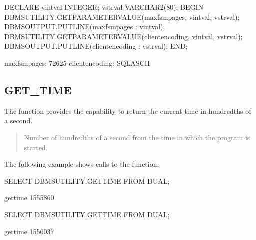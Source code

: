 \documentclass[letterpaper,10pt,english,openany,oneside]{sphinxmanual}
\begin{document}
%
\begin{sphinxVerbatim}[commandchars=\\\{\}]
DECLARE
    v\PYGZus{}intval        INTEGER;
    v\PYGZus{}strval        VARCHAR2(80);
BEGIN
    DBMS\PYGZus{}UTILITY.GET\PYGZus{}PARAMETER\PYGZus{}VALUE(\PYGZsq{}max\PYGZus{}fsm\PYGZus{}pages\PYGZsq{}, v\PYGZus{}intval, v\PYGZus{}strval);
    DBMS\PYGZus{}OUTPUT.PUT\PYGZus{}LINE(\PYGZsq{}max\PYGZus{}fsm\PYGZus{}pages\PYGZsq{} \textbar{}\textbar{} \PYGZsq{}: \PYGZsq{} \textbar{}\textbar{} v\PYGZus{}intval);
    DBMS\PYGZus{}UTILITY.GET\PYGZus{}PARAMETER\PYGZus{}VALUE(\PYGZsq{}client\PYGZus{}encoding\PYGZsq{}, v\PYGZus{}intval, v\PYGZus{}strval);
    DBMS\PYGZus{}OUTPUT.PUT\PYGZus{}LINE(\PYGZsq{}client\PYGZus{}encoding\PYGZsq{} \textbar{}\textbar{} \PYGZsq{}: \PYGZsq{} \textbar{}\textbar{} v\PYGZus{}strval);
END;

max\PYGZus{}fsm\PYGZus{}pages: 72625
client\PYGZus{}encoding: SQL\PYGZus{}ASCII
\end{sphinxVerbatim}

\newpage


\subsection{GET\_TIME}
\label{\detokenize{dbms_utility:get-time}}
The  function provides the capability to return the current
time in hundredths of a second.
\begin{quote}

\end{quote}


\begin{quote}

Number of hundredths of a second from the time in which the program is
started.
\end{quote}


The following example shows calls to the  function.

%
\begin{sphinxVerbatim}[commandchars=\\\{\}]
SELECT DBMS\PYGZus{}UTILITY.GET\PYGZus{}TIME FROM DUAL;

 get\PYGZus{}time
\PYGZhy{}\PYGZhy{}\PYGZhy{}\PYGZhy{}\PYGZhy{}\PYGZhy{}\PYGZhy{}\PYGZhy{}\PYGZhy{}\PYGZhy{}
  1555860

SELECT DBMS\PYGZus{}UTILITY.GET\PYGZus{}TIME FROM DUAL;

 get\PYGZus{}time
\PYGZhy{}\PYGZhy{}\PYGZhy{}\PYGZhy{}\PYGZhy{}\PYGZhy{}\PYGZhy{}\PYGZhy{}\PYGZhy{}\PYGZhy{}
  1556037
\end{sphinxVerbatim}
\end{document}
